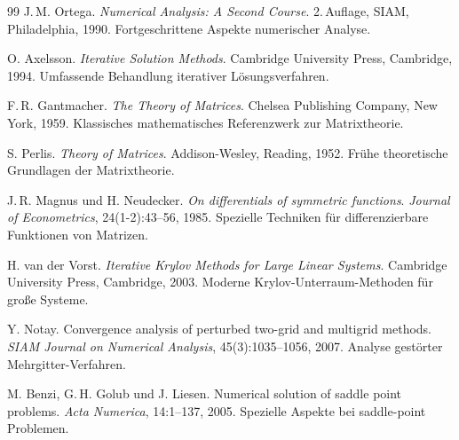 \documentclass[a4paper,12pt]{article}
\theoremstyle{definition}
\begin{document}
\begin{thebibliography}{99}
J.\,M. Ortega. \textit{Numerical Analysis: A Second Course}. 2.\,Auflage, SIAM, Philadelphia, 1990.
\newblock Fortgeschrittene Aspekte numerischer Analyse.

O. Axelsson. \textit{Iterative Solution Methods}. Cambridge University Press, Cambridge, 1994.
\newblock Umfassende Behandlung iterativer Lösungsverfahren.

F.\,R. Gantmacher. \textit{The Theory of Matrices}. Chelsea Publishing Company, New York, 1959.
\newblock Klassisches mathematisches Referenzwerk zur Matrixtheorie.

S. Perlis. \textit{Theory of Matrices}. Addison-Wesley, Reading, 1952.
\newblock Frühe theoretische Grundlagen der Matrixtheorie.

J.\,R. Magnus und H. Neudecker. \textit{On differentials of symmetric functions}. \textit{Journal of Econometrics}, 24(1-2):43--56, 1985.
\newblock Spezielle Techniken für differenzierbare Funktionen von Matrizen.

H. van der Vorst. \textit{Iterative Krylov Methods for Large Linear Systems}. Cambridge University Press, Cambridge, 2003.
\newblock Moderne Krylov-Unterraum-Methoden für große Systeme.

Y. Notay. Convergence analysis of perturbed two-grid and multigrid methods. \textit{SIAM Journal on Numerical Analysis}, 45(3):1035--1056, 2007.
\newblock Analyse gestörter Mehrgitter-Verfahren.

M. Benzi, G.\,H. Golub und J. Liesen. Numerical solution of saddle point problems. \textit{Acta Numerica}, 14:1--137, 2005.
\newblock Spezielle Aspekte bei saddle-point Problemen.

\end{thebibliography}
\end{document}
